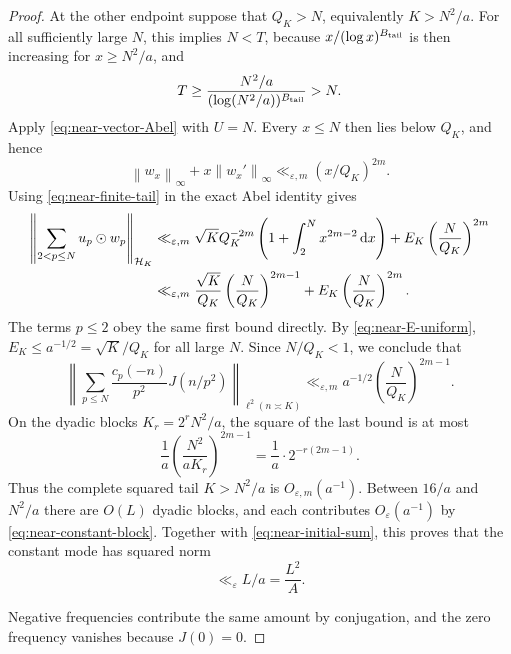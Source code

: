 \documentclass[11pt]{article}
\numberwithin{equation}{section}
\theoremstyle{definition}
\newcommand{\1}{\mathbf 1}
\newcommand{\dd}{\,\mathrm d}
\newcommand{\norm}[1]{\left\lVert#1\right\rVert}
\begin{document}
\begin{proof}
At the other endpoint suppose that \(Q_K>N\), equivalently
\(K>N^2/a\).  For all sufficiently large \(N\), this implies \(N<T\),
because \(x/(\log x)^{B_{\rm tail}}\) is then increasing for
\(x\ge N^2/a\), and
\[
 T\ge\frac{N^2/a}{(\log(N^2/a))^{B_{\rm tail}}}>N.
\]
Apply \eqref{eq:near-vector-Abel} with \(U=N\).  Every \(x\le N\)
then lies below \(Q_K\), and hence
\begin{equation}\label{eq:near-low-envelope-tail}
 \norm{w_x}_\infty+x\norm{w_x'}_\infty
 \ll_{\varepsilon,m}(x/Q_K)^{2m}.
\end{equation}
Using \eqref{eq:near-finite-tail} in the exact Abel identity gives
\begin{align}
 \left\|\sum_{2<p\le N}u_p\odot w_p\right\|_{\mathcal H_K}
 &\ll_{\varepsilon,m}
 \sqrt K Q_K^{-2m}
 \left(1+\int_2^N x^{2m-2}\dd x\right)
 +E_K\left(\frac N{Q_K}\right)^{2m}\notag\\
 &\ll_{\varepsilon,m}
 \frac{\sqrt K}{Q_K}
 \left(\frac N{Q_K}\right)^{2m-1}
 +E_K\left(\frac N{Q_K}\right)^{2m}.
 \label{eq:near-terminal-block-detail}
\end{align}
The terms \(p\le2\) obey the same first bound directly.  By
\eqref{eq:near-E-uniform}, \(E_K\le a^{-1/2}=\sqrt K/Q_K\) for all
large \(N\).  Since \(N/Q_K<1\), we conclude that
\begin{equation}\label{eq:near-terminal-block}
 \left\|\sum_{p\le N}\frac{c_p(-n)}{p^2}J(n/p^2)
 \right\|_{\ell^2(n\asymp K)}
 \ll_{\varepsilon,m}
 a^{-1/2}\left(\frac N{Q_K}\right)^{2m-1}.
\end{equation}
On the dyadic blocks \(K_r=2^rN^2/a\), the square of the last bound is
at most
\[
 \frac1a\left(\frac{N^2}{aK_r}\right)^{2m-1}
 =\frac1a\cdot2^{-r(2m-1)}.
\]
Thus the complete squared tail \(K>N^2/a\) is
\(O_{\varepsilon,m}(a^{-1})\).  Between \(16/a\) and \(N^2/a\)
there are \(O(L)\) dyadic blocks, and each contributes
\(O_\varepsilon(a^{-1})\) by \eqref{eq:near-constant-block}.
Together with \eqref{eq:near-initial-sum}, this proves that the constant
mode has squared norm
\begin{equation}\label{eq:near-constant}
 \ll_\varepsilon L/a=\frac{L^2}{A}.
\end{equation}

Negative frequencies contribute the same amount by conjugation, and the
zero frequency vanishes because \(J(0)=0\).


\end{proof}
\end{document}
